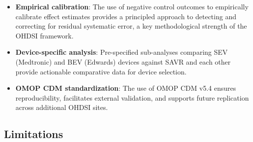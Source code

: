 \documentclass[
  12pt,
]{article}
\begin{document}
\begin{itemize}
  adjustment approaches (1:1 matching, stratification, IPTW, unadjusted)
  in parallel allows for evaluation of method-specific sensitivity and
  strengthens causal inference when results are consistent across
  approaches.
\item
  \textbf{Empirical calibration}: The use of negative control outcomes
  to empirically calibrate effect estimates provides a principled
  approach to detecting and correcting for residual systematic error, a
  key methodological strength of the OHDSI framework.
\item
  \textbf{Device-specific analysis}: Pre-specified sub-analyses
  comparing SEV (Medtronic) and BEV (Edwards) devices against SAVR and
  each other provide actionable comparative data for device selection.
\item
  \textbf{OMOP CDM standardization}: The use of OMOP CDM v5.4 ensures
  reproducibility, facilitates external validation, and supports future
  replication across additional OHDSI sites.
\end{itemize}

\subsection{Limitations}\label{limitations}
\end{document}

